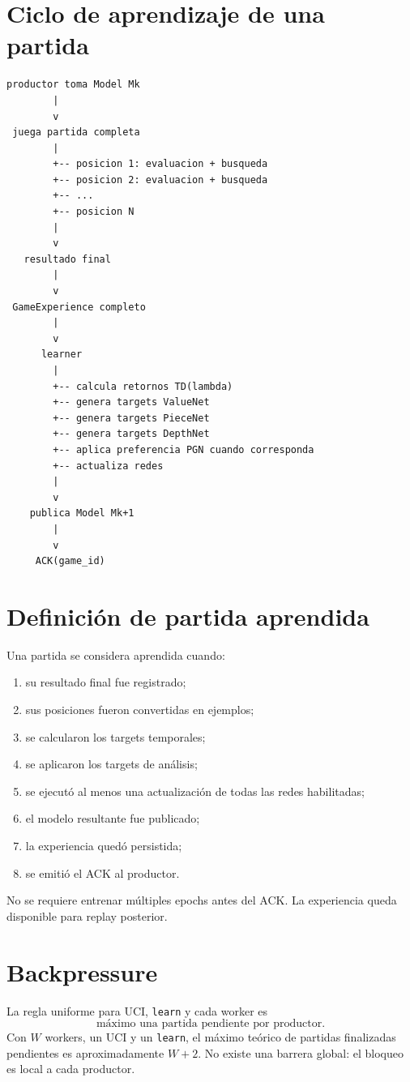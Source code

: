 \documentclass[11pt,a4paper]{article}
\begin{document}
\section{Ciclo de aprendizaje de una partida}
\begin{verbatim}
productor toma Model Mk
        |
        v
 juega partida completa
        |
        +-- posicion 1: evaluacion + busqueda
        +-- posicion 2: evaluacion + busqueda
        +-- ...
        +-- posicion N
        |
        v
   resultado final
        |
        v
 GameExperience completo
        |
        v
      learner
        |
        +-- calcula retornos TD(lambda)
        +-- genera targets ValueNet
        +-- genera targets PieceNet
        +-- genera targets DepthNet
        +-- aplica preferencia PGN cuando corresponda
        +-- actualiza redes
        |
        v
    publica Model Mk+1
        |
        v
     ACK(game_id)
\end{verbatim}

\section{Definición de partida aprendida}
Una partida se considera aprendida cuando:
\begin{enumerate}
\item su resultado final fue registrado;
\item sus posiciones fueron convertidas en ejemplos;
\item se calcularon los targets temporales;
\item se aplicaron los targets de análisis;
\item se ejecutó al menos una actualización de todas las redes habilitadas;
\item el modelo resultante fue publicado;
\item la experiencia quedó persistida;
\item se emitió el ACK al productor.
\end{enumerate}
No se requiere entrenar múltiples epochs antes del ACK. La experiencia queda disponible para replay posterior.

\section{Backpressure}
La regla uniforme para UCI, \texttt{learn} y cada worker es
\[
\boxed{\text{máximo una partida pendiente por productor}}.
\]
Con $W$ workers, un UCI y un \texttt{learn}, el máximo teórico de partidas finalizadas pendientes es aproximadamente $W+2$. No existe una barrera global: el bloqueo es local a cada productor.
\end{document}
